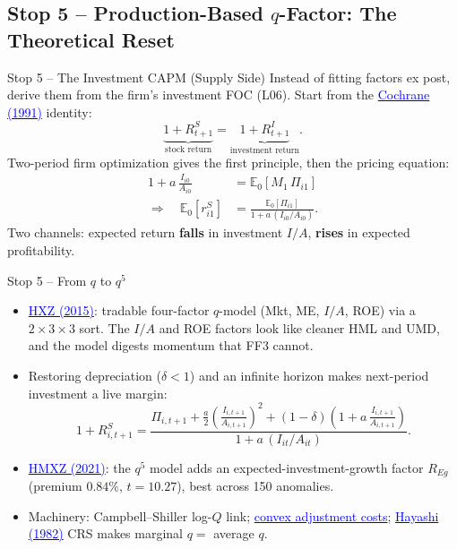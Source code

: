 \documentclass{beamer}
\newcommand{\E}{\mathbb{E}}
\begin{document}
\subsection{Stop 5 -- Production-Based $q$-Factor: The Theoretical Reset}

\begin{frame}{Stop 5 -- The Investment CAPM (Supply Side)}
Instead of fitting factors ex post, derive them from the firm's \alert{investment FOC} (L06). Start from the \href{https://doi.org/10.1111/j.1540-6261.1991.tb03750.x}{\textcolor{blue}{Cochrane (1991)}} identity:
\[
\underbrace{1+R^S_{t+1}}_{\text{stock return}}=\underbrace{1+R^I_{t+1}}_{\text{investment return}}.
\]
Two-period firm optimization gives the first principle, then the pricing equation:
\begin{align*}
1+a\,\frac{I_{i0}}{A_{i0}} &= \E_0\!\left[M_1\,\Pi_{i1}\right] \\[4pt]
\Longrightarrow\quad
\E_0\!\left[r^S_{i1}\right] &= \frac{\E_0[\Pi_{i1}]}{1+a\,(I_{i0}/A_{i0})}.
\end{align*}
\alert{Two channels:} expected return \textbf{falls} in investment $I/A$, \textbf{rises} in expected profitability.
\end{frame}

\begin{frame}{Stop 5 -- From $q$ to $q^5$}
\begin{itemize}
  \item \href{https://doi.org/10.1093/rfs/hhu068}{\textcolor{blue}{HXZ (2015)}}: tradable four-factor $q$-model (Mkt, ME, $I/A$, ROE) via a $2\times3\times3$ sort. The $I/A$ and ROE factors look like cleaner HML and UMD, and the model \alert{digests momentum} that FF3 cannot.
  \item Restoring depreciation ($\delta<1$) and an infinite horizon makes next-period investment a live margin:
  {\small
  \[
  1+R^S_{i,t+1}=\frac{\Pi_{i,t+1}+\tfrac{a}{2}\!\left(\tfrac{I_{i,t+1}}{A_{i,t+1}}\right)^{2}+(1-\delta)\!\left(1+a\,\tfrac{I_{i,t+1}}{A_{i,t+1}}\right)}{1+a\,(I_{it}/A_{it})}.
  \]}
  \item \href{https://doi.org/10.1093/rof/rfaa004}{\textcolor{blue}{HMXZ (2021)}}: the $q^5$ model adds an expected-investment-growth factor $R_{Eg}$ (premium $0.84\%$, $t=10.27$), best across 150 anomalies.
  \item Machinery: Campbell--Shiller log-$Q$ link; \href{https://doi.org/10.1111/j.1540-6261.1991.tb03750.x}{\textcolor{blue}{convex adjustment costs}}; \href{https://doi.org/10.2307/1911522}{\textcolor{blue}{Hayashi (1982)}} CRS makes marginal $q=$ average $q$.
\end{itemize}
\end{frame}
\end{document}
